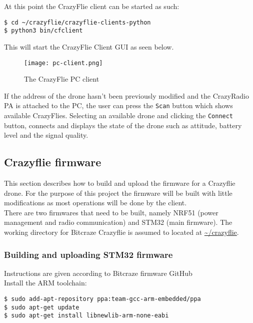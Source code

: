 At this point the CrazyFlie client can be started as such:
\begin{mdframed}[backgroundcolor=light-gray, linecolor=light-gray]
\begin{Verbatim}
$ cd ~/crazyflie/crazyflie-clients-python
$ python3 bin/cfclient
\end{Verbatim}
\end{mdframed}

This will start the CrazyFlie Client GUI as seen below.

\begin{figure}[H]
\centering
 \texttt{[image: pc-client.png]}
 \caption{The CrazyFlie PC client}
 \label{figure:crazyflie_client}
\end{figure}

 If the address of the drone hasn't been previously modified and the CrazyRadio PA is attached to the PC, the user can press the \texttt{Scan} button which shows available CrazyFlies. Selecting an available drone and clicking the \texttt{Connect} button, connects and displays the state of the drone such as attitude, battery level and the signal quality.

\subsection{Crazyflie firmware}
This section describes how to build and upload the firmware for a Crazyflie drone.
For the purpose of this project the firmware will be built with little modifications as most operations will be done by the client.\\

\noindent There are two firmwares that need to be built, namely NRF51 (power management and radio communication) and STM32 (main firmware). The working directory for Bitcraze Crazyflie is assumed to located at \url{~/crazyflie}.

\subsubsection{Building and uploading STM32 firmware}
\noindent Instructions are given according to Bitcraze firmware GitHub \cite{web_bitcraze_git_fw}\\
\noindent Install the ARM toolchain:
\begin{mdframed}[backgroundcolor=light-gray, linecolor=light-gray]
\begin{verbatim}
$ sudo add-apt-repository ppa:team-gcc-arm-embedded/ppa
$ sudo apt-get update
$ sudo apt-get install libnewlib-arm-none-eabi
\end{verbatim}
\end{mdframed}

